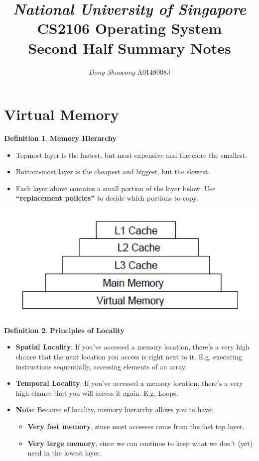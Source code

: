 \documentclass[11pt,a4paper]{article}
\title{\textsl{National University of Singapore} \\ \textbf{CS2106 Operating System}\\ Second Half Summary Notes}
\author{\textit{Dong Shaocong} A0148008J}
\theoremstyle{definition}
\newtheorem{definition}{Definition}[section]
\newenvironment{myitemize}
{ \begin{itemize}
    \setlength{\itemsep}{5pt}
    \setlength{\parskip}{0pt}
    \setlength{\parsep}{0pt}     }
{ \end{itemize}                  }
\begin{document}
\maketitle
\section{Virtual Memory}

\begin{definition}{\textbf{Memory Hierarchy}}
	
	\begin{minipage}{0.5\linewidth}
	\begin{myitemize}
		\item Topmost layer is the fastest, but most expensive and therefore the smallest.
		\item Bottom-most layer is the cheapest and biggest, but the slowest.
		\item Each layer above contains a small portion of the layer below: Use \textbf{``replacement policies''} to decide which portions to copy.

	\end{myitemize}
\end{minipage}
\begin{minipage}{0.5\linewidth}
	\includegraphics[width=\linewidth]{m5/memoryHierarchy}
\end{minipage}
\end{definition}

\begin{definition}{\textbf{Principles of Locality}}
	\begin{myitemize}
		\item \textbf{Spatial Locality}: If you've accessed a memory location, there's a very high chance that the next location you access is right next to it. E.g. executing instructions sequentially, accessing elements of an array.
		\item \textbf{Temporal Locality}: If you've accessed a memory location, there's a very high chance that you will access it again. E.g. Loops.
		\item \textbf{Note}: Because of locality, memory hierarchy allows you to have:
		\begin{myitemize}
			\item \textbf{Very fast memory}, since most accesses come from the fast top layer.
			\item \textbf{Very large memory}, since we can continue to keep what we don't (yet) need in the lowest layer.
		\end{myitemize}
	\end{myitemize}
\end{definition}
\end{document}
